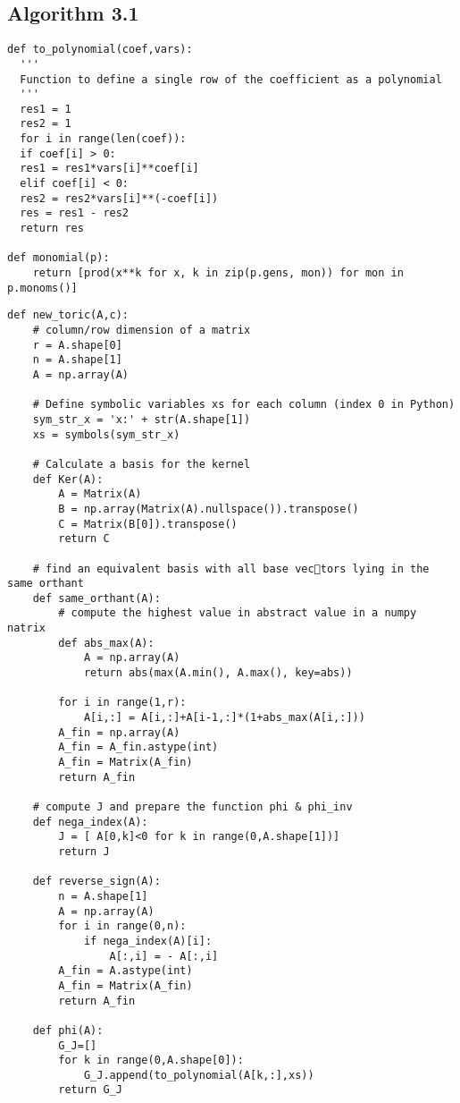 \documentclass{article}
\theoremstyle{plain}
\theoremstyle{definition}
\begin{document}
\begin{propsition}
\subsection{Algorithm 3.1}
\begin{verbatim}
def to_polynomial(coef,vars):
  '''
  Function to define a single row of the coefficient as a polynomial
  '''
  res1 = 1
  res2 = 1
  for i in range(len(coef)):
  if coef[i] > 0:
  res1 = res1*vars[i]**coef[i]
  elif coef[i] < 0:
  res2 = res2*vars[i]**(-coef[i])
  res = res1 - res2
  return res
            
def monomial(p):
    return [prod(x**k for x, k in zip(p.gens, mon)) for mon in p.monoms()]
\end{verbatim}

\begin{verbatim}
def new_toric(A,c):
    # column/row dimension of a matrix
    r = A.shape[0]
    n = A.shape[1]
    A = np.array(A)
    
    # Define symbolic variables xs for each column (index 0 in Python)
    sym_str_x = 'x:' + str(A.shape[1])
    xs = symbols(sym_str_x)
    
    # Calculate a basis for the kernel
    def Ker(A):
        A = Matrix(A)
        B = np.array(Matrix(A).nullspace()).transpose()
        C = Matrix(B[0]).transpose()
        return C
    
    # find an equivalent basis with all base vectors lying in the same orthant
    def same_orthant(A):    
        # compute the highest value in abstract value in a numpy natrix
        def abs_max(A):
            A = np.array(A)
            return abs(max(A.min(), A.max(), key=abs))

        for i in range(1,r):
            A[i,:] = A[i,:]+A[i-1,:]*(1+abs_max(A[i,:]))
        A_fin = np.array(A)
        A_fin = A_fin.astype(int)
        A_fin = Matrix(A_fin)
        return A_fin
    
    # compute J and prepare the function phi & phi_inv
    def nega_index(A):
        J = [ A[0,k]<0 for k in range(0,A.shape[1])]
        return J

    def reverse_sign(A):
        n = A.shape[1]
        A = np.array(A)
        for i in range(0,n):
            if nega_index(A)[i]:
                A[:,i] = - A[:,i]
        A_fin = A.astype(int)
        A_fin = Matrix(A_fin)
        return A_fin

    def phi(A):
        G_J=[]
        for k in range(0,A.shape[0]):
            G_J.append(to_polynomial(A[k,:],xs))
        return G_J


\end{verbatim}
\end{propsition}
\end{document}
